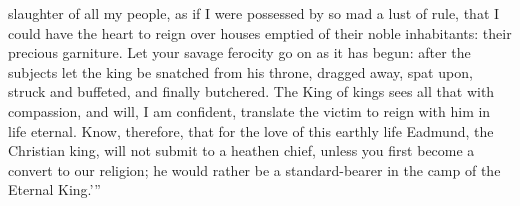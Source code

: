 \documentclass[10pt]{book}
\begin{document}
\vspace{-2\parskip}
\vspace{-3\lineskip}
slaughter of all my people, as if I were possessed by so mad a lust of rule, that I could have the heart to reign over houses emptied of their noble inhabitants: their precious garniture. Let your savage ferocity go on as it has begun: after the subjects let the king be snatched from his throne, dragged away, spat upon, struck and buffeted, and finally butchered. The King of kings sees all that with compassion, and will, I am confident, translate the victim to reign with him in life eternal. Know, therefore, that for the love of this earthly life Eadmund, the Christian king, will not submit to a heathen chief, unless you first become a convert to our religion; he would rather be a standard-bearer in the camp of the Eternal King.'\hspace{1pt}''
\end{document}
